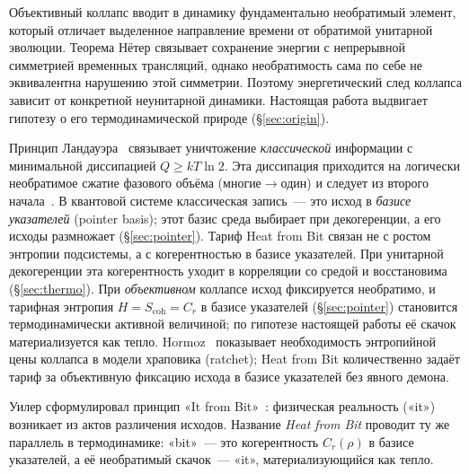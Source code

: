 \documentclass[11pt,a4paper]{article}
\newcommand{\Sref}[1]{\hyperref[#1]{\S\ref{#1}}}
\begin{document}
Объективный коллапс вводит в динамику фундаментально необратимый элемент, который отличает выделенное направление времени от обратимой унитарной эволюции. Теорема Нётер связывает сохранение энергии с непрерывной симметрией временных трансляций, однако необратимость сама по себе не эквивалентна нарушению этой симметрии. Поэтому энергетический след коллапса зависит от конкретной неунитарной динамики. Настоящая работа выдвигает гипотезу о его термодинамической природе (\Sref{sec:origin}).

Принцип Ландауэра~\cite{landauer1961} связывает уничтожение \emph{классической} информации с минимальной диссипацией $Q \ge kT\ln 2$. Эта диссипация приходится на логически необратимое сжатие фазового объёма (многие$\to$один) и следует из второго начала~\cite{bennett1982,sagawa2008}. В квантовой системе классическая запись~--- это исход в \emph{базисе указателей} (pointer basis); этот базис среда выбирает при декогеренции, а его исходы размножает (\Sref{sec:pointer}). Тариф Heat from Bit связан не с ростом энтропии подсистемы, а с когерентностью в базисе указателей. При унитарной декогеренции эта когерентность уходит в корреляции со средой и восстановима (\Sref{sec:thermo}). При \emph{объективном} коллапсе исход фиксируется необратимо, и тарифная энтропия $H=S_{\mathrm{coh}}=C_r$ в базисе указателей (\Sref{sec:pointer}) становится термодинамически активной величиной; по гипотезе настоящей работы её скачок материализуется как тепло. Hormoz~\cite{hormoz2013} показывает необходимость энтропийной цены коллапса в модели храповика (ratchet); Heat from Bit количественно задаёт тариф за объективную фиксацию исхода в базисе указателей без явного демона.

Уилер сформулировал принцип «It from Bit»~\cite{wheeler1989}: физическая реальность («it») возникает из актов различения исходов. Название \emph{Heat from Bit} проводит ту же параллель в термодинамике: «bit»~--- это когерентность $C_r(\rho)$ в базисе указателей, а её необратимый скачок~--- «it», материализующийся как тепло.
\end{document}
